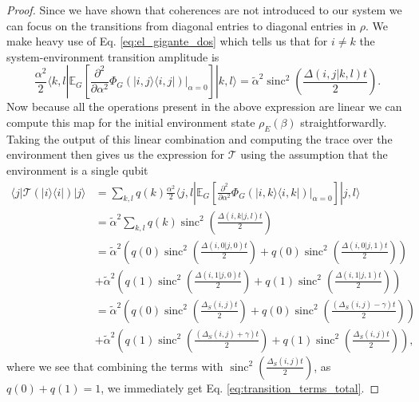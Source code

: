 \documentclass{article}
\newcommand{\ket}[1]{|#1\rangle}
\newcommand{\bra}[1]{\langle #1|}
\newcommand{\ketbra}[2]{| #1\rangle\! \langle #2|}
\DeclareMathOperator{\sinc}{sinc}
\begin{document}
\begin{proof}
    Since we have shown that coherences are not introduced to our system we can focus on the transitions from diagonal entries to diagonal entries in $\rho$. We make heavy use of Eq. \eqref{eq:el_gigante_dos} which tells us that for $i \neq k$ the system-environment transition amplitude is
    \begin{equation}
        \frac{\alpha^2}{2}\bra{k, l} \mathbb{E}_G \left[ \frac{\partial^2}{\partial \alpha^2} \Phi_G(\ketbra{i, j}{i,j}) \big|_{\alpha = 0} \right] \ket{k, l} = \widetilde{\alpha}^2 \sinc^2 \left( \frac{\Delta(i,j | k, l) t}{2} \right). 
    \end{equation}
    Now because all the operations present in the above expression are linear we can compute this map for the initial environment state $\rho_E(\beta)$ straightforwardly. Taking the output of this linear combination and computing the trace over the environment then gives us the expression for $\mathcal{T}$ using the assumption that the environment is a single qubit
    \begin{align}
        \bra{j} \mathcal{T}(\ketbra{i}{i}) \ket{j} &= \sum_{k, l} q(k) \frac{\alpha^2}{2}\bra{j, l} \mathbb{E}_G \left[ \frac{\partial^2}{\partial \alpha^2} \Phi_G(\ketbra{i, k}{i,k}) \big|_{\alpha = 0} \right] \ket{j, l} \\
        &= \widetilde{\alpha}^2 \sum_{k, l} q(k) \sinc^2 \left(\frac{\Delta(i, k | j , l) t}{2} \right) \\
        &= \widetilde{\alpha}^2 \left(q(0) \sinc^2 \left(\frac{\Delta(i, 0 | j , 0) t}{2} \right) + q(0) \sinc^2 \left(\frac{\Delta(i, 0 | j , 1) t}{2} \right) \right) \nonumber \\
        & + \widetilde{\alpha}^2 \left(q(1) \sinc^2 \left(\frac{\Delta(i, 1 | j , 0) t}{2} \right) + q(1) \sinc^2 \left(\frac{\Delta(i, 1 | j , 1) t}{2} \right) \right) \\
        &= \widetilde{\alpha}^2 \left(q(0) \sinc^2 \left(\frac{\Delta_S(i,j) t}{2} \right) + q(0) \sinc^2 \left(\frac{(\Delta_S(i,j) - \gamma) t}{2} \right) \right) \nonumber \\
        & + \widetilde{\alpha}^2 \left(q(1) \sinc^2 \left(\frac{(\Delta_S(i, j) + \gamma) t}{2} \right) + q(1) \sinc^2 \left(\frac{\Delta_S(i,j) t}{2} \right) \right),
    \end{align}
    where we see that combining the terms with $\sinc^2 \left(\frac{\Delta_S(i,j) t}{2} \right)$, as $q(0) + q(1) = 1$, we immediately get Eq. \eqref{eq:transition_terms_total}. 
    

\end{proof}
\end{document}

